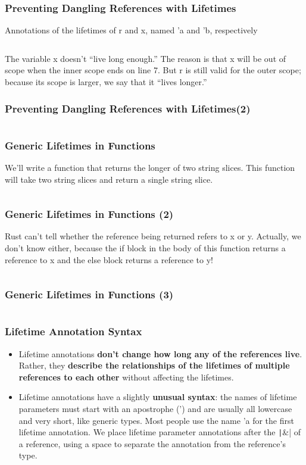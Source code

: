 \documentclass{beamer}
\begin{document}
\begin{frame}[fragile]
	\frametitle{Preventing Dangling References with Lifetimes}
	Annotations of the lifetimes of r and x, named 'a and 'b, respectively
	
	\inputminted{rust}{./code/dangling-ref.rs}
	
	The variable x doesn’t “live long enough.” The reason is that x will be out of scope when the inner scope ends on line 7. But r is still valid for the outer scope; because its scope is larger, we say that it “lives longer.” 
\end{frame}

\begin{frame}[fragile]
	\frametitle{Preventing Dangling References with Lifetimes(2)}
	\inputminted{shell}{./code/dangling-ref.shell}
\end{frame}


\begin{frame}[fragile]
	\frametitle{Generic Lifetimes in Functions}
	We’ll write a function that returns the longer of two string slices. This function will take two string slices and return a single string slice.
	
	\inputminted{rust}{./code/lifetime.rs}
\end{frame}



\begin{frame}[fragile]
	\frametitle{Generic Lifetimes in Functions (2)}
	Rust can’t tell whether the reference being returned refers to x or y. Actually, we don’t know either, because the if block in the body of this function returns a reference to x and the else block returns a reference to y!
	
	\inputminted{rust}{./code/lifetime2.rs}
\end{frame}


\begin{frame}[fragile]
	\frametitle{Generic Lifetimes in Functions (3)}
	\inputminted{shell}{./code/lifetime2.shell}
\end{frame}

\begin{frame}[fragile]
	\frametitle{Lifetime Annotation Syntax}
\begin{itemize}
	\item 	Lifetime annotations \textbf{don’t change how long any of the references live}. Rather, they \textbf{describe the relationships of the lifetimes of multiple references to each other }without affecting the lifetimes.
	\item 	Lifetime annotations have a slightly \textbf{unusual syntax}: the names of lifetime parameters must start with an apostrophe (') and are usually all lowercase and very short, like generic types. Most people use the name 'a for the first lifetime annotation. We place lifetime parameter annotations after the \texttt|&| of a reference, using a space to separate the annotation from the reference’s type.
	
	\inputminted{rust}{./code/lifetime3.rs}
\end{itemize}
\end{frame}
\end{document}
